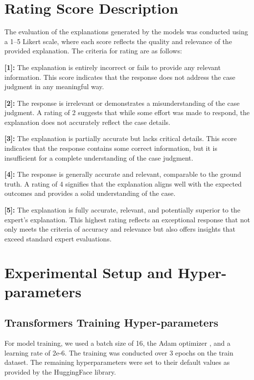 \section{Rating Score Description}
\label{section:rating-score-description}
The evaluation of the explanations generated by the models was conducted using a 1–5 Likert scale, where each score reflects the quality and relevance of the provided explanation. The criteria for rating are as follows:

\textbf{[1]:} The explanation is entirely incorrect or fails to provide any relevant information. This score indicates that the response does not address the case judgment in any meaningful way.

\textbf{[2]:} The response is irrelevant or demonstrates a misunderstanding of the case judgment. A rating of 2 suggests that while some effort was made to respond, the explanation does not accurately reflect the case details.

\textbf{[3]:} The explanation is partially accurate but lacks critical details. This score indicates that the response contains some correct information, but it is insufficient for a complete understanding of the case judgment.

\textbf{[4]:} The response is generally accurate and relevant, comparable to the ground truth. A rating of 4 signifies that the explanation aligns well with the expected outcomes and provides a solid understanding of the case.

\textbf{[5]:} The explanation is fully accurate, relevant, and potentially superior to the expert's explanation. This highest rating reflects an exceptional response that not only meets the criteria of accuracy and relevance but also offers insights that exceed standard expert evaluations.

\section{Experimental Setup and Hyper-parameters}
\label{sec:Experimental-setup}

\subsection{Transformers Training Hyper-parameters}
For model training, we used a batch size of 16, the Adam optimizer \cite{kingma2014adam}, and a learning rate of 2e-6. The training was conducted over 3 epochs on the \texttt{\named} train dataset. The remaining hyperparameters were set to their default values as provided by the HuggingFace library.

